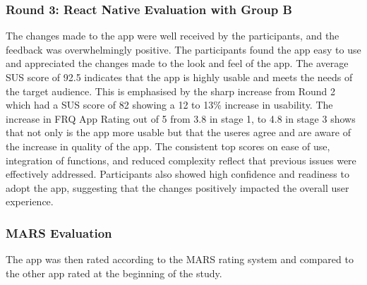 \subsubsection{Round 3: React Native Evaluation with Group B}
The changes made to the app were well received by the participants, and the feedback was overwhelmingly positive. The participants found the app easy to use and appreciated the changes made to the look and feel of the app. The average SUS score of 92.5 indicates that the app is highly usable and meets the needs of the target audience. This is emphasised by the sharp increase from Round 2 which had a SUS score of 82 showing a 12 to 13\% increase in usability. The increase in FRQ App Rating out of 5 from 3.8 in stage 1, to 4.8 in stage 3 shows that not only is the app more usable but that the useres agree and are aware of the increase in quality of the app. The consistent top scores on ease of use, integration of functions, and reduced complexity reflect that previous issues were effectively addressed. Participants also showed high confidence and readiness to adopt the app, suggesting that the changes positively impacted the overall user experience. 

\subsubsection{MARS Evaluation}
The app was then rated according to the MARS rating system and compared to the other app rated at the beginning of the study. 

